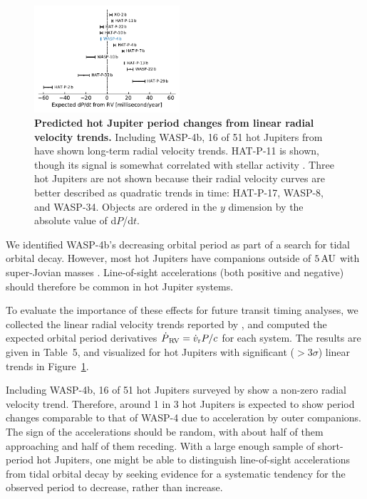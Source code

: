 \documentclass[12pt,twocolumn,tighten]{aastex62}
\begin{document}
\begin{figure}[t]
	\begin{center}
		\leavevmode
		\includegraphics[width=0.48\textwidth]{f5.pdf}
	\end{center}
	\vspace{-0.4cm}
	\caption{
  {\bf Predicted hot Jupiter period changes from linear radial
  velocity trends.} Including WASP-4b, 16 of 51 hot Jupiters from
  \citet{knutson_friends_2014} have shown long-term radial velocity
  trends.  HAT-P-11 is shown, though its signal is somewhat correlated
  with stellar activity \citep{yee_hat-p-11_2018}.  Three hot Jupiters
  are not shown because their radial velocity curves are better
  described as quadratic trends in time: HAT-P-17, WASP-8, and
  WASP-34.  Objects are ordered in the $y$ dimension by the absolute
  value of d$P$/d$t$.
	\label{fig:pdot_pop}
  \vspace{-0.3cm}
	}
\end{figure}

We identified WASP-4b's decreasing orbital period as part of a search
for tidal orbital decay.  However, most hot Jupiters have companions
outside of $5\,{\rm AU}$ with super-Jovian masses
\citep{knutson_friends_2014,bryan_statistics_2016}.  Line-of-sight
accelerations (both positive and negative) should therefore be common
in hot Jupiter systems. 

To evaluate the importance of these effects for future transit timing
analyses, we collected the linear radial velocity trends reported by
\citet{knutson_friends_2014}, and computed the expected orbital period
derivatives $\dot{P}_{\rm\,RV} = \dot{v}_{\rm r} P/c$ for each system.
The results are given in Table~5, and visualized for hot Jupiters with
significant ($>$$3\sigma$) linear trends in Figure~\ref{fig:pdot_pop}.

Including WASP-4b, 16 of 51 hot Jupiters surveyed by
\citet{knutson_friends_2014} show a non-zero radial velocity trend.
Therefore, around 1 in 3 hot Jupiters is expected to show period
changes comparable to that of WASP-4 due to acceleration by outer
companions.  The sign of the accelerations should be random, with
about half of them approaching and half of them receding.  With a
large enough sample of short-period hot Jupiters, one might be able to
distinguish line-of-sight accelerations from tidal orbital decay by
seeking evidence for a systematic tendency for the observed period to
decrease, rather than increase.
\end{document}
